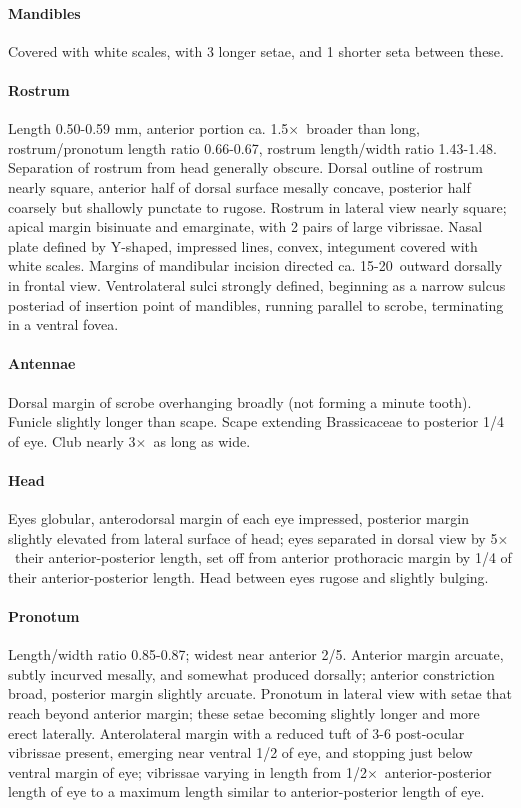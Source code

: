 \documentclass[fleqn,10pt,lineno]{wlpeerj} %
\newcommand{\td}{\textdegree~}
\newcommand{\x}{$\times$~}
\begin{document}
			\paragraph{Mandibles}
				Covered with white scales, with 3 longer setae, and 1 shorter seta between these.
			\paragraph{Rostrum}
				Length 0.50-0.59 mm, anterior portion ca. 1.5\x broader than long, rostrum/pronotum length ratio 0.66-0.67, rostrum length/width ratio 1.43-1.48.
				Separation of rostrum from head generally obscure. 
				Dorsal outline of rostrum nearly square, anterior half of dorsal surface mesally concave, posterior half coarsely but shallowly punctate to rugose. 
				Rostrum in lateral view nearly square; apical margin bisinuate and emarginate, with 2 pairs of large vibrissae. 
				Nasal plate defined by Y-shaped, impressed lines, convex, integument covered with white scales.
				Margins of mandibular incision directed ca. 15-20\td outward dorsally in frontal view. 
				Ventrolateral sulci strongly defined, beginning as a narrow sulcus posteriad of insertion point of mandibles, running parallel to scrobe, terminating in a ventral fovea.
			\paragraph{Antennae}
				Dorsal margin of scrobe overhanging broadly (not forming a minute tooth).
				Funicle slightly longer than scape.
				Scape extending Brassicaceae  to posterior 1/4 of eye.
				Club nearly 3\x as long as wide.
			\paragraph{Head}
				Eyes globular, anterodorsal margin of each eye impressed, posterior margin slightly elevated from lateral surface of head; eyes separated in dorsal view by 5\x their anterior-posterior length, set off from anterior prothoracic margin by 1/4 of their anterior-posterior length.
				Head between eyes rugose and slightly bulging.
			\paragraph{Pronotum}
				Length/width ratio 0.85-0.87; widest near anterior 2/5.
				Anterior margin arcuate, subtly incurved mesally, and somewhat produced dorsally; anterior constriction broad, posterior margin slightly arcuate.
				Pronotum in lateral view with setae that reach beyond anterior margin; these setae becoming slightly longer and more erect laterally.
				Anterolateral margin with a reduced tuft of 3-6 post-ocular vibrissae present, emerging near ventral 1/2 of eye, and stopping just below ventral margin of eye; vibrissae varying in length from 1/2\x anterior-posterior length of eye to a maximum length similar to anterior-posterior length of eye.
\end{document}
